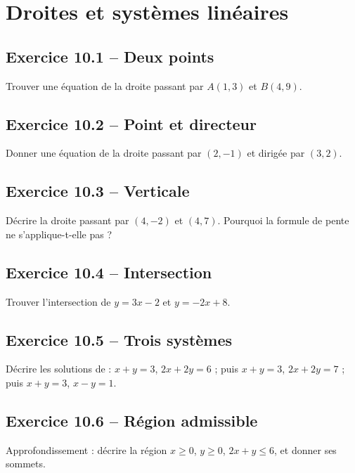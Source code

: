 \chapter{Droites et systèmes linéaires}
\section*{Exercice 10.1 -- Deux points}
Trouver une équation de la droite passant par $A(1,3)$ et $B(4,9)$.

\section*{Exercice 10.2 -- Point et directeur}
Donner une équation de la droite passant par $(2,-1)$ et dirigée par $(3,2)$.

\section*{Exercice 10.3 -- Verticale}
Décrire la droite passant par $(4,-2)$ et $(4,7)$. Pourquoi la formule de pente ne s'applique-t-elle pas ?

\section*{Exercice 10.4 -- Intersection}
Trouver l'intersection de $y=3x-2$ et $y=-2x+8$.

\section*{Exercice 10.5 -- Trois systèmes}
Décrire les solutions de : $x+y=3$, $2x+2y=6$ ; puis $x+y=3$, $2x+2y=7$ ; puis $x+y=3$, $x-y=1$.

\section*{Exercice 10.6 -- Région admissible}
Approfondissement : décrire la région $x\geq0$, $y\geq0$, $2x+y\leq6$, et donner ses sommets.
